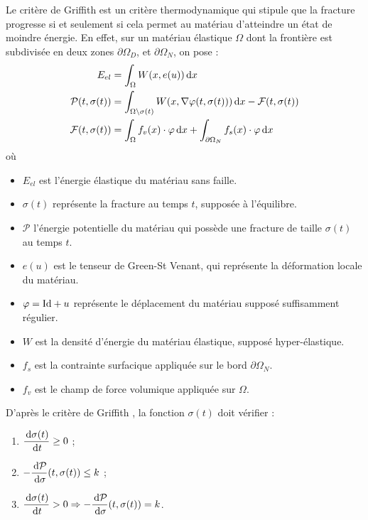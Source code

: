 Le critère de Griffith est un critère thermodynamique qui stipule que la fracture progresse si et seulement si cela permet au matériau d’atteindre un état de moindre énergie. En effet, sur un matériau élastique $\Omega$ dont la frontière est subdivisée en deux zones $\partial \Omega_D$, et $\partial \Omega_N$, on pose \parencite[p.31]{balasoiu2020thesis} :
\begin{align*}
    E_{el} &= \int_{\Omega} W (x, e(u)) \diff x     \\
    \mathcal{P}(t,\sigma(t)) &= \int_{\Omega \backslash \sigma(t) } W (x, \nabla\varphi (t, \sigma(t))) \diff x - \mathcal{F}(t,\sigma(t)) \\
    \mathcal{F}(t,\sigma(t)) &= \int_{\Omega} f_v (x)\cdot \varphi \diff x + \int_{\partial\Omega_N} f_s (x) \cdot \varphi \diff x
\end{align*}
où 
\begin{itemize}
    \item $E_{el}$ est l'énergie élastique du matériau sans faille.
    \item $\sigma(t)$ représente la fracture au temps $t$, supposée à l'équilibre.
    \item $\mathcal{P}$ l’énergie potentielle du matériau qui possède une fracture de taille $\sigma(t)$ au temps $t$.
    \item $e(u)$ est le tenseur de Green-St Venant, qui représente la déformation locale du matériau.
    \item $\varphi = \text{Id} + u$ représente le déplacement du matériau supposé suffisamment régulier.
    \item $W$ est la densité d’énergie du matériau élastique, supposé hyper-élastique.
    \item $f_s$ est la contrainte surfacique appliquée sur le bord $\partial \Omega_N$.
    \item $f_v$ est le champ de force volumique appliquée sur $\Omega$.
\end{itemize}
D'après le critère de Griffith \parencite[p.32]{balasoiu2020thesis}, la fonction $\sigma(t)$ doit vérifier :
\begin{enumerate}
    \item $\dfrac{\diff \sigma(t)}{\diff t} \geq 0$ ;
    \item $-\dfrac{\diff \mathcal{P}}{\diff \sigma} (t,\sigma(t)) \leq k$ ;
    \item $\dfrac{\diff \sigma(t)}{\diff t} > 0 \Rightarrow -\dfrac{\diff \mathcal{P}}{\diff \sigma} (t,\sigma(t)) = k$.
\end{enumerate}

